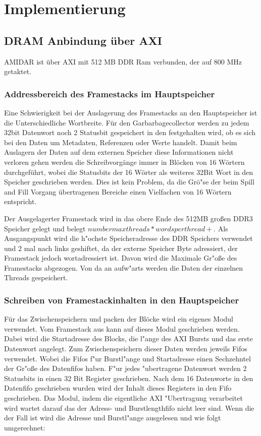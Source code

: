 \chapter{Implementierung}
\label{cha:Implementierung}
\section{DRAM Anbindung \"uber AXI}
AMIDAR ist \"uber AXI mit 512 MB DDR Ram verbunden, der auf 800 MHz getaktet.


\subsection{Addressbereich des Framestacks im Hauptspeicher}
Eine Schwierigkeit bei der Auslagerung des Framestacks an den Hauptspeicher ist die Unterschiedliche Wortbreite. 
F\"ur den Garbarbagecollector werden zu jedem 32bit Datenwort noch 2 Statusbit gespeichert in den festgehalten wird, ob es sich bei den Daten um Metadaten, Referenzen oder Werte handelt. Damit beim Auslagern der Daten auf dem externen Speicher diese Informationen nicht verloren gehen werden die Schreibvorg\"ange immer in Bl\"ocken von 16 W\"ortern durchgef\"uhrt, wobei die Statusbits der 16 W\"orter als weiteres 32Bit Wort in den Speicher geschrieben werden. Dies ist kein Problem, da die Gr\"o"se der beim Spill and Fill Vorgang \"ubertragenen Bereiche einen Vielfachen von 16 W\"ortern entspricht. 

Der Ausgelagerter Framestack wird in das obere Ende des 512MB großen DDR3 Speicher gelegt und belegt  $number max threads * words per thread +  $.
Als Ausgangspunkt wird die h"ochste Speicheradresse des DDR Speichers verwendet und 2 mal nach links geshiftet, da der externe Speicher Byte adressiert, der Framestack jedoch wortadressiert ist. Davon wird die Maximale Gr"oße des Framestacks abgezogen. Von da an aufw"arts werden die Daten der einzelnen Threads gespeichert.

\subsection{Schreiben von Framestackinhalten in den Hauptspeicher}
F\"ur das Zwischenspeichern und packen der Bl\"ocke wird ein eigenes Modul verwendet.
Vom Framestack aus kann auf dieses Modul geschrieben werden. Dabei wird die Startadresse des Blocks, die l"ange des AXI Bursts und das erste Datenwort angelegt. Zum Zwischenspeichern dieser Daten werden jeweils Fifos verwendet. Wobei die Fifos f"ur Burstl"ange und Startadresse einen Sechzehntel der Gr"o{\ss}e des Datenfifos haben. F"ur jedes "ubertragene Datenwort werden 2 Statusbits in einen 32 Bit Register geschrieben. Nach dem 16 Datenworte in den Datenfifo geschrieben wurden wird der Inhalt dieses Registers in den Fifo geschrieben. 
Das Modul, indem die eigentliche AXI "Ubertragung verarbeitet wird wartet darauf das der Adress- und Burstlengthfifo nicht leer sind. Wenn die der Fall ist wird die Adresse und Burstl"ange ausgelesen und wie folgt umgerechnet:

